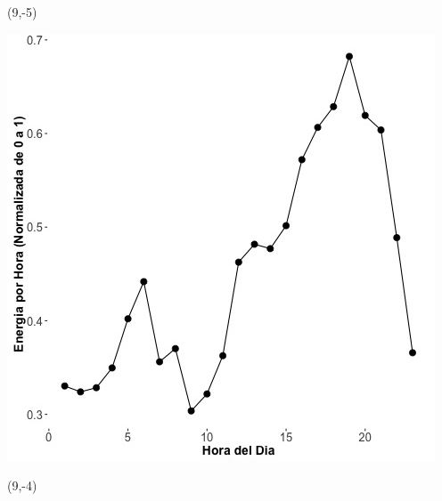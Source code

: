 \documentclass{article}\usepackage[]{graphicx}\usepackage[]{color}
\newenvironment{knitrout}{}{} %
\begin{document}
 \begin{textblock}{1}(9,-5)
\begin{minipage}{20em}
\begingroup

\endgroup
\end{minipage}
\end{textblock}

\begin{knitrout}
\color{fgcolor}
\includegraphics[scale=0.65]{figure/A17_plot_norm_median} 
\end{knitrout}


 \begin{textblock}{1}(9,-4)
\begin{minipage}{20em}
\begingroup

\endgroup
\end{minipage}
\end{textblock}
\end{document}
